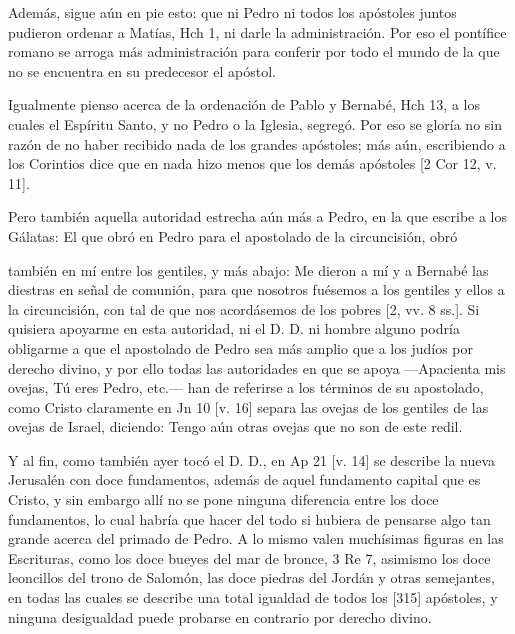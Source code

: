 Además, sigue aún en pie esto: que ni Pedro ni todos los apóstoles juntos pudieron ordenar a Matías, Hch 1, ni darle la administración. Por eso el pontífice romano se arroga más administración para conferir por todo el mundo de la que no se encuentra en su predecesor el apóstol.

Igualmente pienso acerca de la ordenación de Pablo y Bernabé, Hch 13, a los cuales el Espíritu Santo, y no Pedro o la Iglesia, segregó. Por eso se gloría no sin razón de no haber recibido nada de los grandes apóstoles; más aún, escribiendo a los Corintios dice que en nada hizo menos que los demás apóstoles [2 Cor 12, v. 11].

Pero también aquella autoridad estrecha aún más a Pedro, en la que escribe a los Gálatas: El que obró en Pedro para el apostolado de la circuncisión, obró

también en mí entre los gentiles, y más abajo: Me dieron a mí y a Bernabé las diestras en señal de comunión, para que nosotros fuésemos a los gentiles y ellos a la circuncisión, con tal de que nos acordásemos de los pobres [2, vv. 8 ss.]. Si quisiera apoyarme en esta autoridad, ni el D. D. ni hombre alguno podría obligarme a que el apostolado de Pedro sea más amplio que a los judíos por derecho divino, y por ello todas las autoridades en que se apoya —Apacienta mis ovejas, Tú eres Pedro, etc.— han de referirse a los términos de su apostolado, como Cristo claramente en Jn 10 [v. 16] separa las ovejas de los gentiles de las ovejas de Israel, diciendo: Tengo aún otras ovejas que no son de este redil.

Y al fin, como también ayer tocó el D. D., en Ap 21 [v. 14] se describe la nueva Jerusalén con doce fundamentos, además de aquel fundamento capital que es Cristo, y sin embargo allí no se pone ninguna diferencia entre los doce fundamentos, lo cual habría que hacer del todo si hubiera de pensarse algo tan grande acerca del primado de Pedro. A lo mismo valen muchísimas figuras en las Escrituras, como los doce bueyes del mar de bronce, 3 Re 7, asimismo los doce leoncillos del trono de Salomón, las doce piedras del Jordán y otras semejantes, en todas las cuales se describe una total igualdad de todos los [315] apóstoles, y ninguna desigualdad puede probarse en contrario por derecho divino.

